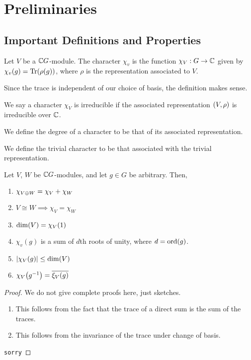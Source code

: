 \section{Preliminaries}

\subsection{Important Definitions and Properties}

\begin{boxdefinition}[Character]
    Let $V$ be a $\mathbb{C} G$-module. The character $\chi_v$ is the function $\chi_V : G \to \mathbb{C}$ given by $\chi_v(g) = \operatorname{Tr}\!\left( \rho(g) \right)$, where $\rho$ is the representation associated to $V$.
\end{boxdefinition}

\begin{remark}
    Since the trace is independent of our choice of basis, the definition makes sense.
\end{remark}

\begin{definition}[Irreducibility]
    We say a character $\chi_V$ is irreducible if the associated representation $\left( V, \rho \right)$ is irreducible over $\mathbb{C}$.
\end{definition}
\begin{definition}[Degree]
    We define the degree of a character to be that of its associated representation.
\end{definition}
\begin{definition}
    We define the trivial character to be that associated with the trivial representation.
\end{definition}

\begin{proposition}
    Let $V$, $W$ be $\mathbb{C} G$-modules, and let $g \in G$ be arbitrary. Then,
    \begin{enumerate}[label = \normalfont \arabic*., noitemsep]
        \item $\chi_{V \oplus W} = \chi_V + \chi_W$
        \item $V \cong W \implies \chi_V = \chi_W$
        \item $\dim\!\left( V \right) = \chi_V(1)$
        \item $\chi_v(g)$ is a sum of $d$th roots of unity, where $d = \operatorname{ord}\!\left( g \right)$.
        \item $\left\lvert \chi_V(g) \right\rvert \leq \dim\!\left( V \right)$
        \item $\chi_V\!\left( g^{-1} \right) = \overline{\xi_V(g)}$
    \end{enumerate}
\end{proposition}
\begin{proof}
    We do not give complete proofs here, just sketches.
    \begin{enumerate}
        \item This follows from the fact that the trace of a direct sum is the sum of the traces.
        \item This follows from the invariance of the trace under change of basis.
    \end{enumerate}
    \verb|sorry|
\end{proof}


